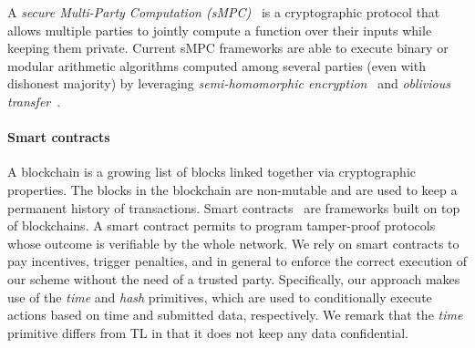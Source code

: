 A {\em secure Multi-Party Computation (\em sMPC)}~\cite{DBLP:journals/corr/abs-1804-03548,yao82} is a cryptographic protocol that allows multiple parties to jointly compute a function over their inputs while keeping them private.
Current sMPC frameworks are able to execute binary or modular arithmetic algorithms computed among several parties (even with dishonest majority) by leveraging {\em semi-homomorphic encryption}~\cite{spdz,keller2018overdrive} and {\em oblivious transfer}~\cite{mascot,rabin2005exchange}.

\smallskip

\paragraph*{Smart contracts}

A blockchain is a growing list of blocks linked together via cryptographic properties. The blocks in the blockchain are non-mutable and are used to keep a permanent history of transactions.
Smart contracts~\cite{szabo1997formalizing} are frameworks built on top of blockchains.
A smart contract permits to program tamper-proof protocols whose outcome is verifiable by the whole network.
%
%
We rely on smart contracts to pay incentives, trigger penalties, and in general to enforce the correct execution of our scheme without the need of a trusted party.
Specifically, our approach makes use of the {\em time} and {\em hash} primitives, which are used to conditionally execute actions based on time and submitted data, respectively.
We remark that the {\em time} primitive differs from TL in that it does not keep any data confidential.

